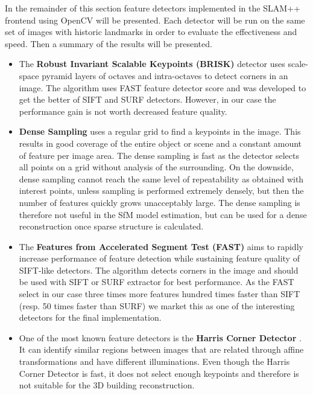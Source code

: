 In the remainder of this section feature detectors implemented in the SLAM++ frontend using OpenCV will be presented. Each detector will be run on the same set of images with historic landmarks in order to evaluate the effectiveness and speed. Then a summary of the results will be presented.
 
\begin{itemize}
	\item The \textbf{Robust Invariant Scalable Keypoints (BRISK)} detector uses scale-space pyramid layers of octaves and intra-octaves to detect corners in an image. The algorithm uses FAST feature detector score and was developed to get the better of SIFT and SURF detectors. However, in our case the performance gain is not worth decreased feature quality. \cite{article:brisk}
	
	\item \textbf{Dense Sampling} uses a regular grid to find a keypoints in the image. This results in good coverage of the entire object or scene and a constant amount of feature per image area. The dense sampling is fast as the detector selects all points on a grid without analysis of the surrounding. On the downside, dense sampling cannot reach the same level of repeatability as obtained with interest points, unless sampling is performed extremely densely, but then the number of features quickly grows unacceptably large. The dense sampling is therefore not useful in the SfM model estimation, but can be used for a dense reconstruction once sparse structure is calculated. \cite{article:dense}
	
	\item The \textbf{Features from Accelerated Segment Test (FAST)} aims to rapidly increase performance of feature detection while sustaining feature quality of SIFT-like detectors. The algorithm detects corners in the image and should be used with SIFT or SURF extractor for best performance. As the FAST select in our case three times more features hundred times faster than SIFT (resp. 50 times faster than SURF) we market this as one of the interesting detectors for the final implementation. \cite{article:fast}
	
	\item One of the most known feature detectors is the \textbf{Harris Corner Detector} . It can identify similar regions between images that are related through affine transformations and have different illuminations. Even though the Harris Corner Detector is fast, it does not select enough keypoints and therefore is not suitable for the 3D building reconstruction. \cite{www:harris}
	

\end{itemize}
